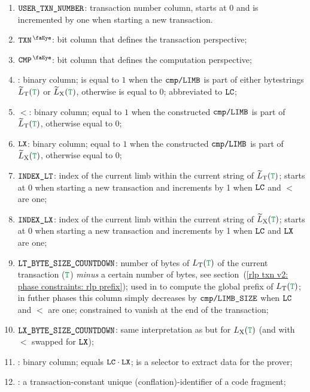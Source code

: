 \begin{enumerate}
    \item $\texttt{USER}\texttt{\_}\texttt{TXN\_NUMBER}$:
	transaction number column, starts at 0 and is incremented by one when starting a new transaction.
    \item $\isTxn$:
	bit column that defines the transaction perspective;
    \item $\isCmp$:
	bit column that defines the computation perspective;
    \item {}:
	binary column;
	is equal to $1$ when the $\texttt{cmp}\texttt{/}\texttt{{\texttt{LIMB}}}$ is part of either \rlp{} bytestrings $\locLtTilde(\locTransaction)$ or $\locLxTilde(\locTransaction)$, otherwise is equal to $0$;
	abbreviated to $\texttt{LC}$;
    \item $\lt$:
	binary column; equal to $1$ when the constructed $\texttt{cmp}\texttt{/}\texttt{{\texttt{LIMB}}}$ is part of $\locLtTilde(\locTransaction)$, otherwise equal to $0$;
    \item $\texttt{LX}$:
	binary column; equal to $1$ when the constructed $\texttt{cmp}\texttt{/}\texttt{{\texttt{LIMB}}}$ is part of $\locLxTilde(\locTransaction)$, otherwise equal to $0$;
    \item $\texttt{INDEX\_LT}$:
	index of the current limb within the current string of $\locLtTilde(\locTransaction)$;
	starts at $0$ when starting a new transaction and increments by 1 when $\texttt{LC}$ and $\lt$ are one; 
    \item $\texttt{INDEX\_LX}$:                                                       
	index of the current limb within the current string of $\locLxTilde(\locTransaction)$;
	starts at $0$ when starting a new transaction and increments by 1 when $\texttt{LC}$ and $\texttt{LX}$ are one;
    \item $\texttt{LT\_BYTE\_SIZE\_COUNTDOWN}$:
	number of bytes of $L_{\mathrm{T}}(\locTransaction)$ of the current transaction ($\locTransaction$) \emph{minus} a certain number of bytes,
	see section~(\ref{rlp txn v2: phase constraints: rlp prefix});
	used in \phaseRlpPrefix{} to compute the global \rlp{} prefix of $L_{\mathrm{T}}(\locTransaction)$;
	in futher phases this column simply decreases by $\texttt{cmp}\texttt{/}\texttt{{LIMB\_SIZE}}$ when $\texttt{LC}$ and $\lt$ are one;
	constrained to vanish at the end of the transaction;
    \item $\texttt{LX\_BYTE\_SIZE\_COUNTDOWN}$:
	same interpretation as \ltByteSizeCountdown{} but for $L_{\mathrm{X}}(\locTransaction)$
	(and with $\lt$ swapped for $\texttt{LX}$);
    \item \toHashByProver{}:
	binary column; equals $\texttt{LC} \cdot \texttt{LX}$; is a selector to extract data for the prover;
    \item \CFI{}:
	a transaction-constant unique (conflation)-identifier of a code fragment;
\end{enumerate}
